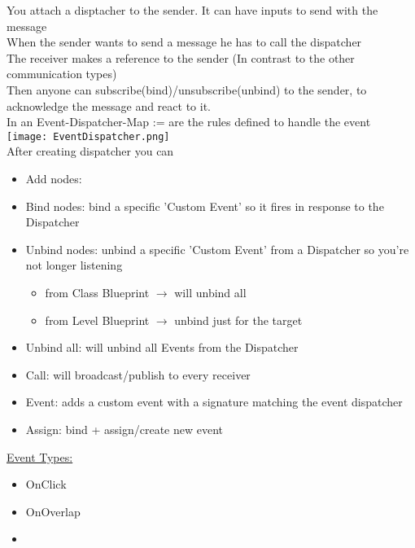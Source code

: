         You attach a disptacher to the sender. It can have inputs to send with the message \\
        When the sender wants to send a message he has to call the dispatcher \\
        The receiver makes a reference to the sender (In contrast to the other communication types) \\
        Then anyone can subscribe(bind)/unsubscribe(unbind) to the sender, to acknowledge the message and react to it. \\
        In an Event-Dispatcher-Map := are the rules defined to handle the event \\
        \texttt{[image: EventDispatcher.png]} \\
        After creating dispatcher you can
        \begin{itemize}
            \item Add nodes:
            \item Bind nodes: bind a specific 'Custom Event' so it fires in response to the Dispatcher
            \item Unbind nodes: unbind a specific 'Custom Event' from a Dispatcher so you're not longer listening
                \begin{itemize}
                    \item from Class Blueprint $\rightarrow$ will unbind all
                    \item from Level Blueprint $\rightarrow$ unbind just for the target
                \end{itemize}
            \item Unbind all: will unbind all Events from the Dispatcher
            \item Call: will broadcast/publish to every receiver
            \item Event: adds a custom event with a signature matching the event dispatcher
            \item Assign: bind + assign/create new event
        \end{itemize}
\smallskip
        \underline{Event Types:}
        \begin{itemize}
            \item OnClick
            \item OnOverlap
            \item  
        \end{itemize}


